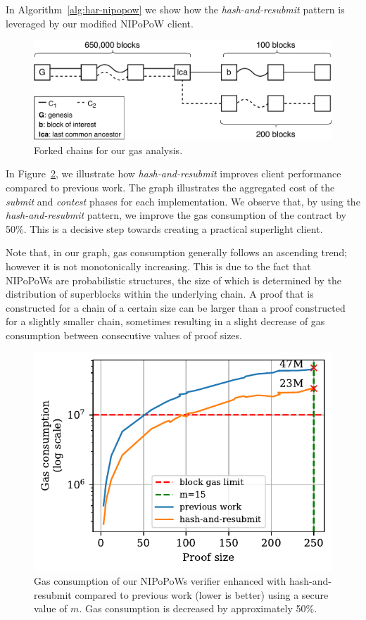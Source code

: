 In Algorithm~\ref{alg:har-nipopow} we show how the \emph{hash-and-resubmit} pattern
is leveraged by our modified NIPoPoW client.

\begin{figure}
    \centering
    \includegraphics[width=0.8\columnwidth]{figures/nipopow-subm-cont}
    \caption{Forked chains for our gas analysis.}
    \label{fig:chains}
\end{figure}

In Figure~\ref{fig:har-nipopow}, we illustrate how \emph{hash-and-resubmit}
improves client performance compared to previous work. The graph
illustrates the aggregated cost of the \emph{submit} and \emph{contest} phases for
each implementation. We observe that, by using the \emph{hash-and-resubmit}
pattern, we improve the gas consumption of the contract by 50\%. This
is a decisive step towards creating a practical superlight client.

Note that, in our graph, gas consumption generally follows an ascending trend; however it
is not monotonically increasing. This is due to the fact that
NIPoPoWs are probabilistic structures, the size of which is determined by the
distribution of superblocks within the underlying chain. A proof that is
constructed for a chain of a certain size can be larger than a proof
constructed for a slightly smaller chain, sometimes resulting in a slight decrease
of gas consumption between consecutive values of proof sizes.



\begin{figure}
    \begin{center}
        \includegraphics[width=0.7\columnwidth]{figures/har-nipopows.pdf}
    \end{center}
    \caption{Gas consumption of our NIPoPoWs verifier enhanced with hash-and-resubmit
        compared to previous work (lower is better) using a secure value of $m$.
        Gas consumption is decreased by approximately 50\%.}
    \label{fig:har-nipopow}
\end{figure}
